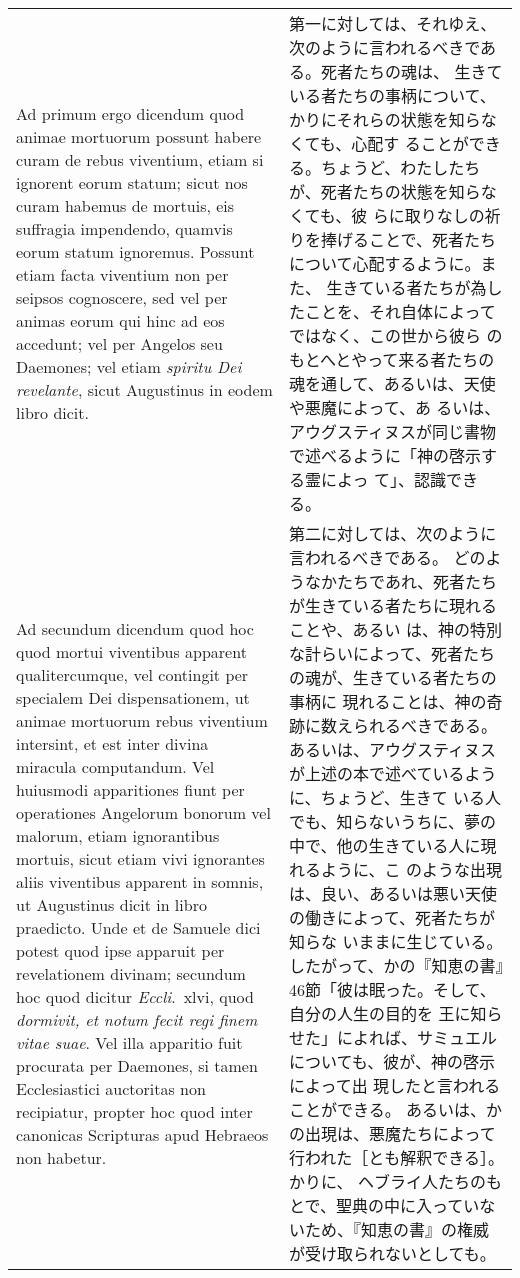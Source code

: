 \documentclass[10pt]{jsarticle} %
\begin{document}
\begin{longtable}{p{21em}p{21em}}
\\




{\sc Ad primum ergo dicendum} quod animae
 mortuorum possunt habere curam de rebus viventium, etiam si ignorent
 eorum statum; sicut nos curam habemus de mortuis, eis suffragia
 impendendo, quamvis eorum statum ignoremus. Possunt etiam facta
 viventium non per seipsos cognoscere, sed vel per animas eorum qui hinc
 ad eos accedunt; vel per Angelos seu Daemones; vel etiam {\it spiritu Dei
 revelante}, sicut Augustinus in eodem libro dicit.

&

第一に対しては、それゆえ、次のように言われるべきである。死者たちの魂は、
生きている者たちの事柄について、かりにそれらの状態を知らなくても、心配す
ることができる。ちょうど、わたしたちが、死者たちの状態を知らなくても、彼
らに取りなしの祈りを捧げることで、死者たちについて心配するように。また、
生きている者たちが為したことを、それ自体によってではなく、この世から彼ら
のもとへとやって来る者たちの魂を通して、あるいは、天使や悪魔によって、あ
るいは、アウグスティヌスが同じ書物で述べるように「神の啓示する霊によっ
て」、認識できる。

\\




{\sc Ad secundum dicendum} quod hoc quod mortui viventibus apparent
 qualitercumque, vel contingit per specialem Dei dispensationem, ut
 animae mortuorum rebus viventium intersint, et est inter divina
 miracula computandum. 
Vel huiusmodi apparitiones fiunt per operationes
 Angelorum bonorum vel malorum, etiam ignorantibus mortuis, sicut etiam
 vivi ignorantes aliis viventibus apparent in somnis, ut Augustinus
 dicit in libro praedicto. 
Unde et de Samuele dici potest quod ipse
 apparuit per revelationem divinam; secundum hoc quod dicitur {\it
 Eccli}.~{\sc xlvi}, quod {\it dormivit, et notum fecit regi finem vitae
 suae}. 
Vel illa apparitio fuit procurata per Daemones, si tamen
 Ecclesiastici auctoritas non recipiatur, propter hoc quod inter
 canonicas Scripturas apud Hebraeos non habetur.

&
第二に対しては、次のように言われるべきである。
どのようなかたちであれ、死者たちが生きている者たちに現れることや、あるい
 は、神の特別な計らいによって、死者たちの魂が、生きている者たちの事柄に
 現れることは、神の奇跡に数えられるべきである。
あるいは、アウグスティヌスが上述の本で述べているように、ちょうど、生きて
 いる人でも、知らないうちに、夢の中で、他の生きている人に現れるように、こ
 のような出現は、良い、あるいは悪い天使の働きによって、死者たちが知らな
 いままに生じている。
したがって、かの『知恵の書』46節「彼は眠った。そして、自分の人生の目的を
 王に知らせた」によれば、サミュエルについても、彼が、神の啓示によって出
 現したと言われることができる。
あるいは、かの出現は、悪魔たちによって行われた［とも解釈できる］。かりに、
 ヘブライ人たちのもとで、聖典の中に入っていないため、『知恵の書』の権威
 が受け取られないとしても。



\end{longtable}
\end{document}
